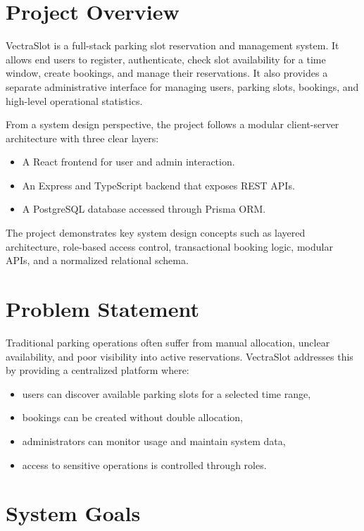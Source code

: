 \documentclass[12pt,a4paper]{article}
\begin{document}
\section{Project Overview}
VectraSlot is a full-stack parking slot reservation and management system. It allows end users to register, authenticate, check slot availability for a time window, create bookings, and manage their reservations. It also provides a separate administrative interface for managing users, parking slots, bookings, and high-level operational statistics.

From a system design perspective, the project follows a modular client-server architecture with three clear layers:
\begin{itemize}
    \item A React frontend for user and admin interaction.
    \item An Express and TypeScript backend that exposes REST APIs.
    \item A PostgreSQL database accessed through Prisma ORM.
\end{itemize}

The project demonstrates key system design concepts such as layered architecture, role-based access control, transactional booking logic, modular APIs, and a normalized relational schema.

\section{Problem Statement}
Traditional parking operations often suffer from manual allocation, unclear availability, and poor visibility into active reservations. VectraSlot addresses this by providing a centralized platform where:
\begin{itemize}
    \item users can discover available parking slots for a selected time range,
    \item bookings can be created without double allocation,
    \item administrators can monitor usage and maintain system data,
    \item access to sensitive operations is controlled through roles.
\end{itemize}

\section{System Goals}
\end{document}
